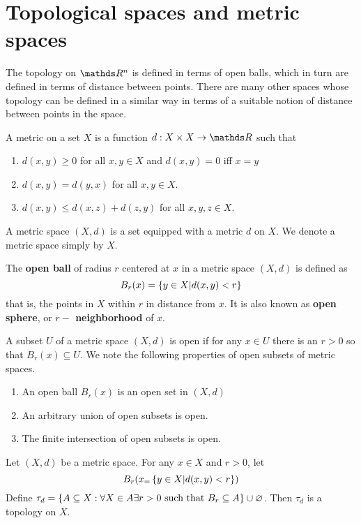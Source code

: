 \documentclass[../main-sheet.tex]{subfiles}
\begin{document}
\chapter{Topological spaces and metric spaces}
The topology on \(\R^n\) is defined in terms of open balls, which in turn are defined in terms of distance between points. There are many other spaces whose topology can be defined in a similar way in terms of a suitable notion of distance between points in the space.
\begin{defn}
    A metric on a set \(X\) is a function \(d:X\times X\to \R\) such that
    \begin{enumerate}
        \item \(d(x,y)\geq 0\) for all \(x,y\in X\) and \(d(x,y)=0\) iff \(x=y\)
        \item \(d(x,y)=d(y,x)\) for all \(x,y\in X\).
        \item \(d(x,y)\leq d(x,z)+d(z,y)\) for all \(x,y,z\in X\).
    \end{enumerate}
    A metric space \((X,d)\) is a set equipped with a metric \(d\) on \(X\). We denote a metric space simply by \(X\).
\end{defn}
The \textbf{open ball} of radius \(r \) centered at \(x\) in a metric space \((X,d)\) is defined as\[B_r(x)=\left\{y\in X|d(x,y)<r\right\}\]
that is, the points in \(X\) within \(r\) in distance from \(x\). It is also known as \textbf{open sphere}, or \textbf{\(r-\) neighborhood} of \(x\).
\begin{defn}
    A subset \(U \) of a metric space \((X,d)\) is open if for any \(x\in U\) there is an \(r>0\) so that \(B_r(x)\subseteq U\). We note the following properties of open subsets of metric spaces.
    \begin{enumerate}
        \item An open ball \(B_r(x)\) is an open set in \((X,d)\)
        \item An arbitrary union of open subsets is open.
        \item The finite intersection of open subsets is open.
    \end{enumerate}
\end{defn}
\begin{thm}
    Let \((X,d)\) be a metric space. For any \(x\in X\) and \(r>0\), let 
    \[B_r(x_=\left\{y\in X|d(x,y)<r\right\})\]
    Define \(\tau_d=\left\{A\subseteq X:\forall X\in A \exists r>0 \text{ such that }B_r\subseteq A\right\}\cup \varnothing\). Then \(\tau_d\) is a topology on \(X\).
\end{thm}
\end{document}
